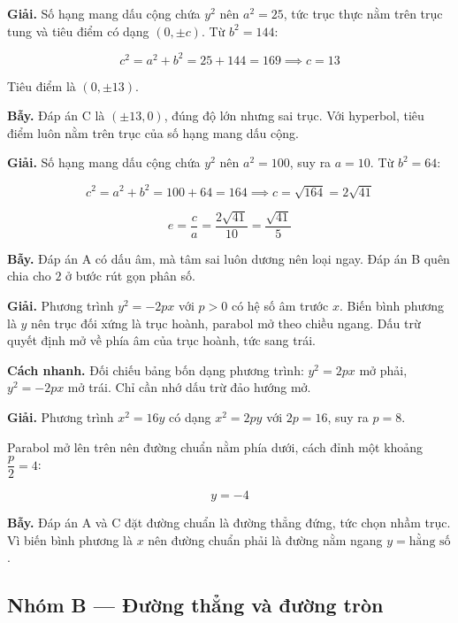 \documentclass[11pt, a4paper]{article}
\begin{document}
\begin{dapan}[9 — Đáp án D]
\textbf{Giải.} Số hạng mang dấu cộng chứa $y^2$ nên $a^2 = 25$, tức trục thực nằm trên trục tung và tiêu điểm có dạng $(0, \pm c)$. Từ $b^2 = 144$:

$$c^2 = a^2 + b^2 = 25 + 144 = 169 \implies c = 13$$

Tiêu điểm là $(0, \pm 13)$.

\textbf{Bẫy.} Đáp án C là $(\pm 13, 0)$, đúng độ lớn nhưng sai trục. Với hyperbol, tiêu điểm luôn nằm trên trục của số hạng mang dấu cộng.
\end{dapan}

\begin{dapan}[10 — Đáp án C]
\textbf{Giải.} Số hạng mang dấu cộng chứa $y^2$ nên $a^2 = 100$, suy ra $a = 10$. Từ $b^2 = 64$:

$$c^2 = a^2 + b^2 = 100 + 64 = 164 \implies c = \sqrt{164} = 2\sqrt{41}$$

$$e = \frac{c}{a} = \frac{2\sqrt{41}}{10} = \frac{\sqrt{41}}{5}$$

\textbf{Bẫy.} Đáp án A có dấu âm, mà tâm sai luôn dương nên loại ngay. Đáp án B quên chia cho $2$ ở bước rút gọn phân số.
\end{dapan}

\begin{dapan}[11 — Đáp án B]
\textbf{Giải.} Phương trình $y^2 = -2px$ với $p > 0$ có hệ số âm trước $x$. Biến bình phương là $y$ nên trục đối xứng là trục hoành, parabol mở theo chiều ngang. Dấu trừ quyết định mở về phía âm của trục hoành, tức sang trái.

\textbf{Cách nhanh.} Đối chiếu bảng bốn dạng phương trình: $y^2 = 2px$ mở phải, $y^2 = -2px$ mở trái. Chỉ cần nhớ dấu trừ đảo hướng mở.
\end{dapan}

\begin{dapan}[12 — Đáp án D]
\textbf{Giải.} Phương trình $x^2 = 16y$ có dạng $x^2 = 2py$ với $2p = 16$, suy ra $p = 8$.

Parabol mở lên trên nên đường chuẩn nằm phía dưới, cách đỉnh một khoảng $\dfrac{p}{2} = 4$:

$$y = -4$$

\textbf{Bẫy.} Đáp án A và C đặt đường chuẩn là đường thẳng đứng, tức chọn nhầm trục. Vì biến bình phương là $x$ nên đường chuẩn phải là đường nằm ngang $y = \text{hằng số}$.
\end{dapan}

\subsection*{Nhóm B — Đường thẳng và đường tròn}
\end{document}
